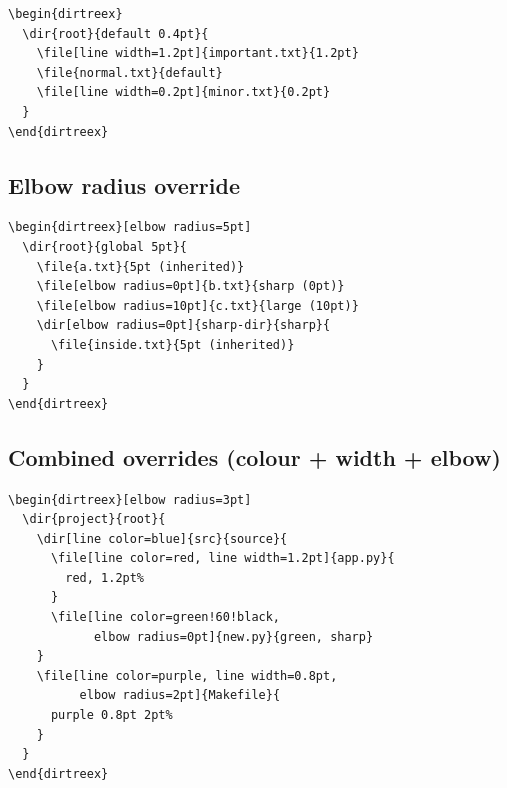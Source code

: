 \documentclass[11pt]{article}
\begin{document}
\begin{Verbatim}
\begin{dirtreex}
  \dir{root}{default 0.4pt}{
    \file[line width=1.2pt]{important.txt}{1.2pt}
    \file{normal.txt}{default}
    \file[line width=0.2pt]{minor.txt}{0.2pt}
  }
\end{dirtreex}
\end{Verbatim}

\begin{dirtreex}
\end{dirtreex}

\subsection{Elbow radius override}

\begin{Verbatim}
\begin{dirtreex}[elbow radius=5pt]
  \dir{root}{global 5pt}{
    \file{a.txt}{5pt (inherited)}
    \file[elbow radius=0pt]{b.txt}{sharp (0pt)}
    \file[elbow radius=10pt]{c.txt}{large (10pt)}
    \dir[elbow radius=0pt]{sharp-dir}{sharp}{
      \file{inside.txt}{5pt (inherited)}
    }
  }
\end{dirtreex}
\end{Verbatim}

\begin{dirtreex}[elbow radius=5pt]
\end{dirtreex}

\subsection{Combined overrides (colour + width + elbow)}

\begin{Verbatim}
\begin{dirtreex}[elbow radius=3pt]
  \dir{project}{root}{
    \dir[line color=blue]{src}{source}{
      \file[line color=red, line width=1.2pt]{app.py}{
        red, 1.2pt%
      }
      \file[line color=green!60!black,
            elbow radius=0pt]{new.py}{green, sharp}
    }
    \file[line color=purple, line width=0.8pt,
          elbow radius=2pt]{Makefile}{
      purple 0.8pt 2pt%
    }
  }
\end{dirtreex}
\end{Verbatim}
\end{document}
